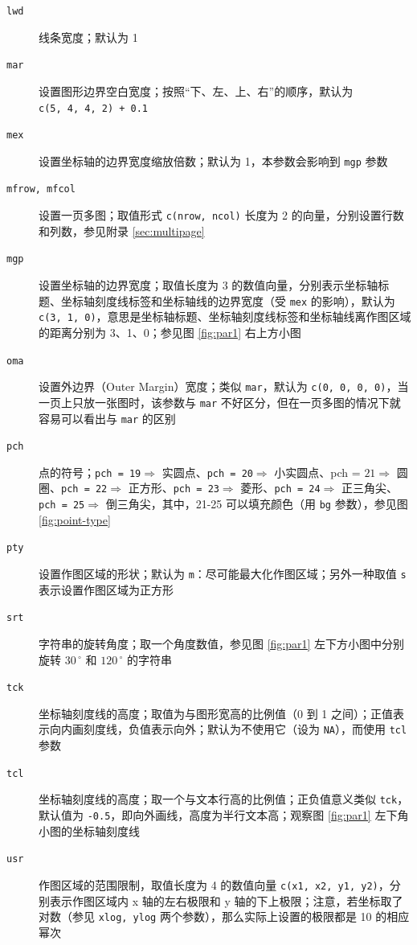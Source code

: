 \documentclass[
  b5paper,
  UTF8,twoside]{book}
\begin{document}
\begin{description}
\item[\texttt{lwd}]
线条宽度；默认为 1
\item[\texttt{mar}]
设置图形边界空白宽度；按照``下、左、上、右''的顺序，默认为 \texttt{c(5,\ 4,\ 4,\ 2)\ +\ 0.1}
\item[\texttt{mex}]
设置坐标轴的边界宽度缩放倍数；默认为 1，本参数会影响到 \texttt{mgp} 参数
\item[\texttt{mfrow,\ mfcol}]
设置一页多图；取值形式 \texttt{c(nrow,\ ncol)} 长度为 2 的向量，分别设置行数和列数，参见附录 \ref{sec:multipage}
\item[\texttt{mgp}]
设置坐标轴的边界宽度；取值长度为 3 的数值向量，分别表示坐标轴标题、坐标轴刻度线标签和坐标轴线的边界宽度（受 \texttt{mex} 的影响），默认为 \texttt{c(3,\ 1,\ 0)}，意思是坐标轴标题、坐标轴刻度线标签和坐标轴线离作图区域的距离分别为 3、1、0；参见图 \ref{fig:par1} 右上方小图
\item[\texttt{oma}]
设置外边界（Outer Margin）宽度；类似 \texttt{mar}，默认为 \texttt{c(0,\ 0,\ 0,\ 0)}，当一页上只放一张图时，该参数与 \texttt{mar} 不好区分，但在一页多图的情况下就容易可以看出与 \texttt{mar} 的区别
\item[\texttt{pch}]
点的符号；\texttt{pch\ =\ 19}\(\Rightarrow\) 实圆点、\texttt{pch\ =\ 20}\(\Rightarrow\) 小实圆点、pch = \(21\Rightarrow\) 圆圈、\texttt{pch\ =\ 22}\(\Rightarrow\) 正方形、\texttt{pch\ =\ 23}\(\Rightarrow\) 菱形、\texttt{pch\ =\ 24}\(\Rightarrow\) 正三角尖、\texttt{pch\ =\ 25}\(\Rightarrow\) 倒三角尖，其中，21-25 可以填充颜色（用 \texttt{bg} 参数），参见图 \ref{fig:point-type}
\item[\texttt{pty}]
设置作图区域的形状；默认为 \texttt{\textquotesingle{}m\textquotesingle{}}：尽可能最大化作图区域；另外一种取值 \texttt{\textquotesingle{}s\textquotesingle{}} 表示设置作图区域为正方形
\item[\texttt{srt}]
字符串的旋转角度；取一个角度数值，参见图 \ref{fig:par1} 左下方小图中分别旋转 \(30\,^{\circ}\) 和 \(120\,^{\circ}\) 的字符串
\item[\texttt{tck}]
坐标轴刻度线的高度；取值为与图形宽高的比例值（0 到 1 之间）；正值表示向内画刻度线，负值表示向外；默认为不使用它（设为 \texttt{NA}），而使用 \texttt{tcl} 参数
\item[\texttt{tcl}]
坐标轴刻度线的高度；取一个与文本行高的比例值；正负值意义类似 \texttt{tck}，默认值为 \texttt{-0.5}，即向外画线，高度为半行文本高；观察图 \ref{fig:par1} 左下角小图的坐标轴刻度线
\item[\texttt{usr}]
作图区域的范围限制，取值长度为 4 的数值向量 \texttt{c(x1,\ x2,\ y1,\ y2)}，分别表示作图区域内 x 轴的左右极限和 y 轴的下上极限；注意，若坐标取了对数（参见 \texttt{xlog,\ ylog} 两个参数），那么实际上设置的极限都是 10 的相应幂次

\end{description}
\end{document}
